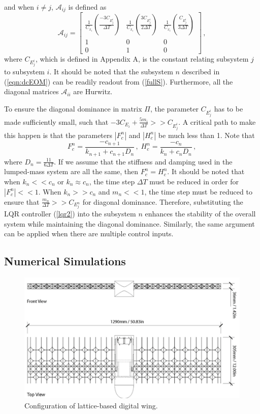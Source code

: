 \documentclass[11pt]{ucthesis}
\begin{document}
and when $i \neq j$, $\mathcal{A}_{ij}$ is defined as 
\[
\mathcal{A}_{ij} = \begin{bmatrix}
\frac{1}{C_{x_i}}\left(\frac{-3C_{E^i_j}}{\Delta T}\right)&\frac{1}{C_{x_i}}\left(\frac{3C_{E^i_j}}{2\Delta T}\right)&\frac{1}{C_{x_i}}\left(\frac{C_{E^i_j}}{3\Delta T}\right)\\1&0&0\\0&1&0
\end{bmatrix}\,,
\]
where $C_{E_j^i}$, which is defined in Appendix A, is the constant relating subsystem $j$ to subsystem $i$. It should be noted that the subsystem $n$ described in (\ref{eqn:dcEOM}) can be readily readout from (\ref{fullS}). Furthermore, all the diagonal matrices $\mathcal{A}_{ii}$ are Hurwitz. 

To ensure the diagonal dominance in matrix $\Pi$, the parameter $C_{E_j^i}$ has to be made sufficiently small, such that $-3C_{E_i}+\frac{5 m_i}{\Delta T}>> C_{E_j^i}$. A critical path to make this happen is that the parameters $|F_{c}^{n}|$ and $|H_{c}^{n}|$ be much less than 1. Note that
\[
F_c^n = \frac{-c_{n+1}}{k_{n+1} + c_{n+1}D_n}  \,,\; H_c^n = \frac{-c_{n}}{k_{n} + c_{n}D_n}\,,
\]
where $D_n = \frac{11}{6 \Delta T}$. If we assume that the stiffness and damping used in the lumped-mass system are all the same, then $F_c^n = H_c^n$. It should be noted that when $k_n << c_n$ or $k_n \approx c_n$, the time step $\Delta T$ must be reduced in order for $|F_{c}^{n}| << 1$. When $k_n >> c_n$ and $m_n << 1$, the time step must be reduced to ensure that $\frac{m_n}{\Delta T}>>C_{E^n_j}$ for diagonal dominance. Therefore, substituting the LQR controller (\ref{lqr2}) into the subsystem $n$ enhances the stability of the overall system while maintaining the diagonal dominance. Similarly, the same argument can be applied when there are multiple control inputs. 

\subsection{Numerical Simulations}
\label{sec:results}

\begin{figure}[thpb]
\centering
\includegraphics[width=0.75\linewidth]{Figures/WingConfiguration.png}
\caption{Configuration of lattice-based digital wing.}
\label{fig:WingConfig}
\end{figure}
\end{document}
